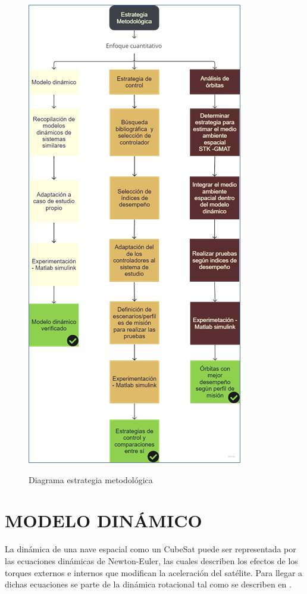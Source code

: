 \newpage
\begin{figure}[!ht]
	\begin{center}
		\includegraphics[scale=0.8]{imagenes/metodologia/grafico_metodologia.png}\\
	\end{center}
	\caption{Diagrama estrategia metodológica}
	\label{fig:metodologia}
	\textit{}
\end{figure}


\newpage
\section{MODELO DINÁMICO}
La dinámica de una nave espacial como un CubeSat puede ser representada por las ecuaciones dinámicas de Newton-Euler, las cuales describen los efectos de los torques externos e internos que modifican la aceleración del satélite. Para llegar a dichas ecuaciones se parte de la dinámica rotacional tal como se describen en \cite{Griffin2004}.

